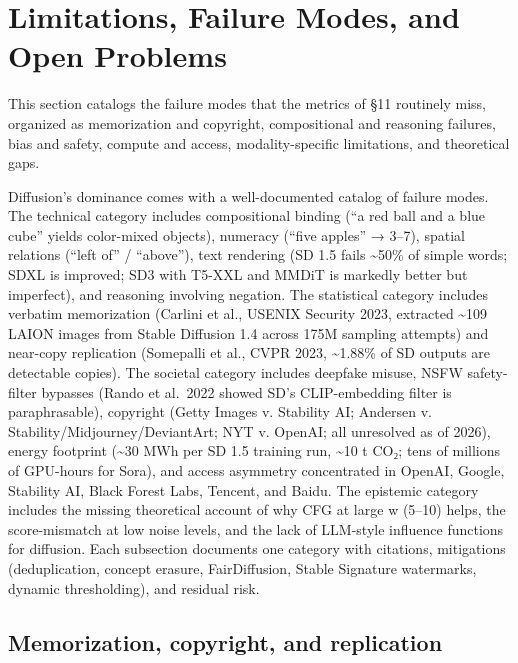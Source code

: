 \documentclass{article}
\begin{document}
\section{Limitations, Failure Modes, and Open Problems}\label{limitations-failure-modes-and-open-problems}

This section catalogs the failure modes that the metrics of §11 routinely miss, organized as memorization and copyright, compositional and reasoning failures, bias and safety, compute and access, modality-specific limitations, and theoretical gaps.

Diffusion's dominance comes with a well-documented catalog of failure modes. The technical category includes compositional binding (``a red ball and a blue cube'' yields color-mixed objects), numeracy (``five apples'' → 3--7), spatial relations (``left of'' / ``above''), text rendering (SD 1.5 fails \textasciitilde50\% of simple words; SDXL is improved; SD3 with T5-XXL and MMDiT is markedly better but imperfect), and reasoning involving negation. The statistical category includes verbatim memorization (Carlini et al., USENIX Security 2023, extracted \textasciitilde109 LAION images from Stable Diffusion 1.4 across 175M sampling attempts) and near-copy replication (Somepalli et al., CVPR 2023, \textasciitilde1.88\% of SD outputs are detectable copies). The societal category includes deepfake misuse, NSFW safety-filter bypasses (Rando et al.~2022 showed SD's CLIP-embedding filter is paraphrasable), copyright (Getty Images v. Stability AI; Andersen v. Stability/Midjourney/DeviantArt; NYT v. OpenAI; all unresolved as of 2026), energy footprint (\textasciitilde30 MWh per SD 1.5 training run, \textasciitilde10 t CO₂; tens of millions of GPU-hours for Sora), and access asymmetry concentrated in OpenAI, Google, Stability AI, Black Forest Labs, Tencent, and Baidu. The epistemic category includes the missing theoretical account of why CFG at large w (5--10) helps, the score-mismatch at low noise levels, and the lack of LLM-style influence functions for diffusion. Each subsection documents one category with citations, mitigations (deduplication, concept erasure, FairDiffusion, Stable Signature watermarks, dynamic thresholding), and residual risk.

\subsection{Memorization, copyright, and replication}\label{memorization-copyright-and-replication}
\end{document}
